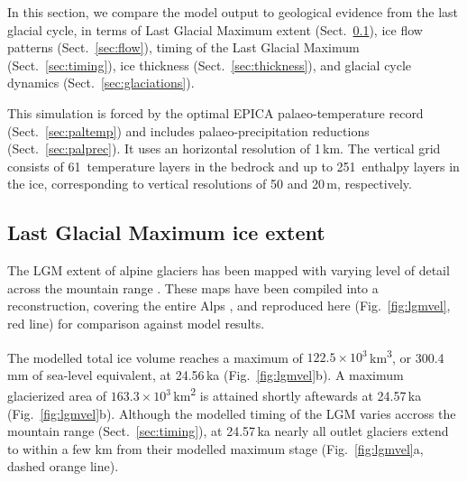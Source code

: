 \documentclass[tc, manuscript]{copernicus}
\begin{document}
    In this section, we compare the model output to geological evidence from
    the last glacial cycle, in terms of Last Glacial Maximum extent
    (Sect.~\ref{sec:extent}), ice flow patterns
    (Sect.~\ref{sec:flow}), timing of the Last Glacial Maximum
    (Sect.~\ref{sec:timing}), ice thickness (Sect.~\ref{sec:thickness}), and
    glacial cycle dynamics (Sect.~\ref{sec:glaciations}).

    This simulation is forced by the optimal EPICA palaeo-temperature record
    (Sect.~\ref{sec:paltemp}) and includes palaeo-precipitation reductions
    (Sect.~\ref{sec:palprec}). It uses an horizontal resolution of 1\,km. The
    vertical grid consists of 61~temperature layers in the bedrock and up to
    251~enthalpy layers in the ice, corresponding to vertical resolutions of 50
    and 20\,\unit{m}, respectively.


\subsection{Last Glacial Maximum ice extent}
\label{sec:extent}

    The LGM extent of alpine glaciers has been mapped with varying level of
    detail across the mountain range \citep{Penck.Bruckner.1909, Jackli.1962,
    Husen.1987, Bini.etal.2009, Coutterand.2010, Bavec.Verbic.2011,
    Buoncristiani.Campy.2011, Husen.2011}. These maps have been compiled
    into a reconstruction, covering the entire Alps \citep{Ehlers.etal.2011},
    and reproduced here (Fig.~\ref{fig:lgmvel}, red line) for comparison
    against model results.

    The modelled total ice volume reaches a maximum of $122.5 \times
    10^{3}$\,\unit{km^3}, or 300.4\,mm of sea-level equivalent, at 24.56\,ka
    (Fig.~\ref{fig:lgmvel}b). A maximum glacierized area of $163.3 \times
    10^{3}$\,\unit{km^2} is attained shortly aftewards at 24.57\,ka
    (Fig.~\ref{fig:lgmvel}b). Although the modelled timing of the LGM varies
    accross the mountain range (Sect.~\ref{sec:timing}), at 24.57\,ka nearly
    all outlet glaciers extend to within a few km from their modelled maximum
    stage (Fig.~\ref{fig:lgmvel}a, dashed orange line).
\end{document}
